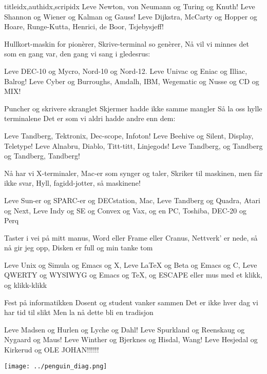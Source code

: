 \documentclass[14pt,letterpaper,norsk]{article}
\begin{document}
\begin{songs}{titleidx,authidx,scripidx}
\beginchorus
Leve Newton, von Neumann og Turing og Knuth!
Leve Shannon og Wiener og Kalman og Gauss!
Leve Dijkstra, McCarty og Hopper og Hoare,
Runge-Kutta, Henrici, de Boor, Tsjebysjeff!
\endchorus

\beginverse
Hullkort-maskin for pionèrer,
Skrive-terminal so genèrer,
Nå vil vi minnes det som en gang var,
den gang vi sang i gledesrus:
\endverse

\beginchorus
Leve DEC-10 og Mycro, Nord-10 og Nord-12.
Leve Univac og Eniac og Illiac, Balrog!
Leve Cyber og Burroughs, Amdalh, IBM,
Wegematic og Nusse og CD og MIX!
\endchorus

\beginverse
Puncher og skrivere skranglet
Skjermer hadde ikke samme mangler
Så la oss hylle terminalene
Det er som vi aldri hadde andre enn dem:
\endverse

\beginchorus
Leve Tandberg, Tektronix, Dec-scope, Infoton!
Leve Beehive og Silent, Display, Teletype!
Leve Alnabru, Diablo, Titt-titt, Linjegods!
Leve Tandberg, og Tandberg og Tandberg, Tandberg!
\endchorus

\beginverse
Nå har vi X-terminaler,
Mac-er som synger og taler,
Skriker til maskinen, men får ikke svar,
Hyll, fagidd-jotter, så maskinene!
\endverse

\beginchorus
Leve Sun-er og SPARC-er og DECstation, Mac,
Leve Tandberg og Quadra, Atari og Next,
Leve Indy og SE og Convex og Vax,
og en PC, Toshiba, DEC-20 og Perq
\endchorus

\beginverse
Taster i vei på mitt manus,
Word eller Frame eller Cranus,
Nettverk' er nede, så nå gir jeg opp,
Disken er full og min tanke tom
\endverse

\beginchorus
Leve Unix og Simula og Emacs og X,
Leve \LaTeX{} og Beta og Emacs og C,
Leve QWERTY og WYSIWYG og Emacs og \TeX{},
og ESCAPE eller mus med et klikk, og klikk-klikk
\endchorus

\beginverse
Fest på informatikken
Dosent og student vanker sammen
Det er ikke hver dag vi har tid til slikt
Men la nå dette bli en tradisjon
\endverse

\beginchorus
Leve Madsen og Hurlen og Lyche og Dahl!
Leve Spurkland og Reenskaug og Nygaard og Maus!
Leve Winther og Bjerknes og Hisdal, Wang!
Leve Hesjedal og Kirkerud og OLE JOHAN!!!!!!
\endchorus
\endsong

\end{songs}

\newpage

\texttt{[image: ../penguin\_diag.png]}
\end{document}
